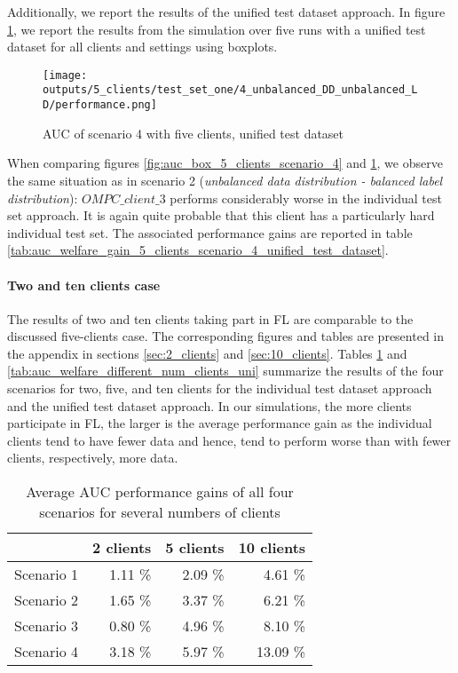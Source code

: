 Additionally, we report the results of the unified test dataset approach. In figure \ref{fig:auc_box_5_clients_scenario_4_uni}, we report the results from the simulation over five runs with a unified test dataset for all clients and settings using boxplots.
\begin{figure}[htb!]
    \centering
    \texttt{[image: outputs/5\_clients/test\_set\_one/4\_unbalanced\_DD\_unbalanced\_LD/performance.png]}
    \caption{AUC of scenario 4 with five clients, unified test dataset}
    \label{fig:auc_box_5_clients_scenario_4_uni}
\end{figure}
When comparing figures \ref{fig:auc_box_5_clients_scenario_4} and \ref{fig:auc_box_5_clients_scenario_4_uni}, we observe the same situation as in scenario 2 (\emph{unbalanced data distribution - balanced label distribution}): $OMPC\_client\_3$ performs considerably worse in the individual test set approach. It is again quite probable that this client has a particularly hard individual test set.
The associated performance gains are reported in table \ref{tab:auc_welfare_gain_5_clients_scenario_4_unified_test_dataset}.


\paragraph*{Two and ten clients case}
The results of two and ten clients taking part in FL are comparable to the discussed five-clients case. The corresponding figures and tables are presented in the appendix in sections \ref{sec:2_clients} and \ref{sec:10_clients}. Tables \ref{tab:auc_welfare_different_num_clients} and \ref{tab:auc_welfare_different_num_clients_uni} summarize the results of the four scenarios for two, five, and ten clients for the individual test dataset approach and the unified test dataset approach. In our simulations, the more clients participate in FL, the larger is the average performance gain as the individual clients tend to have fewer data and hence, tend to perform worse than with fewer clients, respectively, more data.
\begin{table}[h]
\centering
\caption{Average AUC performance gains of all four scenarios for several numbers of clients}
\label{tab:auc_welfare_different_num_clients}
\begin{tabular}{lrrr}
\toprule
{} &  2 clients & 5 clients & 10 clients \\
\midrule
Scenario 1 &                1.11 \% & 2.09 \% & 4.61 \% \\
Scenario 2 &                1.65 \% & 3.37 \% & 6.21 \% \\
Scenario 3 &                0.80 \% & 4.96 \% & 8.10 \% \\
Scenario 4 &                3.18 \% & 5.97 \% & 13.09 \% \\
\bottomrule
\end{tabular}
\end{table}

